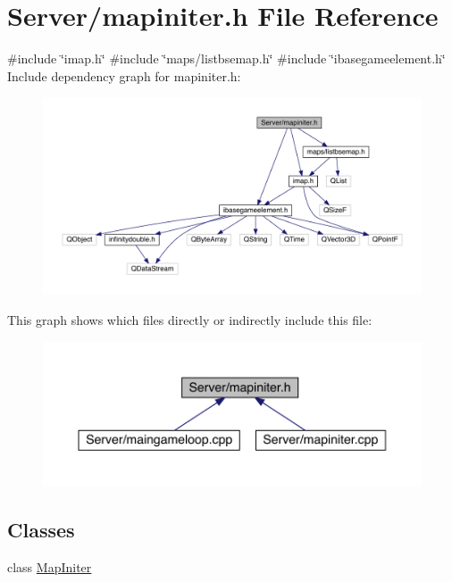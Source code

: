 \hypertarget{a00098}{}\section{Server/mapiniter.h File Reference}
\label{a00098}
{\ttfamily \#include \char`\"{}imap.\+h\char`\"{}}\newline
{\ttfamily \#include \char`\"{}maps/listbsemap.\+h\char`\"{}}\newline
{\ttfamily \#include \char`\"{}ibasegameelement.\+h\char`\"{}}\newline
Include dependency graph for mapiniter.\+h\+:
\nopagebreak
\begin{figure}[H]
\begin{center}
\leavevmode
\includegraphics[width=350pt]{da/d74/a00099}
\end{center}
\end{figure}
This graph shows which files directly or indirectly include this file\+:
\nopagebreak
\begin{figure}[H]
\begin{center}
\leavevmode
\includegraphics[width=350pt]{d0/d61/a00100}
\end{center}
\end{figure}
\subsection*{Classes}
\begin{DoxyCompactItemize}
\item 
class \hyperlink{a00217}{Map\+Initer}
\end{DoxyCompactItemize}
